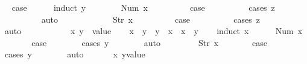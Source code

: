\begin{isabellebody}
\ \isamarkupfalse%
\ {\isacharquery}case\isanewline
\ \ \ \ \isamarkupfalse%
\ {\isacharparenleft}induct\ y{\isacharparenright}\isanewline
\ \ \ \ \ \ \isamarkupfalse%
\ {\isacharparenleft}Num\ x{\isacharparenright}\isanewline
\ \ \ \ \ \ \isamarkupfalse%
\ \isamarkupfalse%
\ {\isacharquery}case\isanewline
\ \ \ \ \ \ \ \ \isamarkupfalse%
\ {\isacharparenleft}cases\ z{\isacharparenright}\isanewline
\ \ \ \ \ \ \ \ \isamarkupfalse%
\ auto\isanewline
\ \ \ \ \isamarkupfalse%
\isanewline
\ \ \ \ \ \ \isamarkupfalse%
\ {\isacharparenleft}Str\ x{\isacharparenright}\isanewline
\ \ \ \ \ \ \isamarkupfalse%
\ \isamarkupfalse%
\ {\isacharquery}case\isanewline
\ \ \ \ \ \ \ \ \isamarkupfalse%
\ {\isacharparenleft}cases\ z{\isacharparenright}\isanewline
\ \ \ \ \ \ \ \ \isamarkupfalse%
\ auto\isanewline
\ \ \ \ \isamarkupfalse%
\isanewline
\ \ \isamarkupfalse%
\isanewline
{}\isamarkupfalse%
\isanewline
\ \ \isamarkupfalse%
\ x\ y\ {\isacharcolon}{\isacharcolon}\ {\isachardoublequoteopen}value{\isachardoublequoteclose}\isanewline
\ \ \isamarkupfalse%
\ {\isachardoublequoteopen}x\ {\isasymle}\ y\ {\isasymLongrightarrow}\ y\ {\isasymle}\ x\ {\isasymLongrightarrow}\ x\ {\isacharequal}\ y{\isachardoublequoteclose}\isanewline
\ \ \isamarkupfalse%
\ {\isacharparenleft}induct\ x{\isacharparenright}\isanewline
\ \ \ \ \isamarkupfalse%
\ {\isacharparenleft}Num\ x{\isacharparenright}\isanewline
\ \ \ \ \isamarkupfalse%
\ \isamarkupfalse%
\ {\isacharquery}case\isanewline
\ \ \ \ \ \ \isamarkupfalse%
\ {\isacharparenleft}cases\ y{\isacharparenright}\isanewline
\ \ \ \ \ \ \isamarkupfalse%
\ auto\isanewline
\ \ \isamarkupfalse%
\isanewline
\ \ \ \ \isamarkupfalse%
\ {\isacharparenleft}Str\ x{\isacharparenright}\isanewline
\ \ \ \ \isamarkupfalse%
\ \isamarkupfalse%
\ {\isacharquery}case\isanewline
\ \ \ \ \ \ \isamarkupfalse%
\ {\isacharparenleft}cases\ y{\isacharparenright}\isanewline
\ \ \ \ \ \ \isamarkupfalse%
\ auto\isanewline
\ \ \isamarkupfalse%
\isanewline
{}\isamarkupfalse%
\isanewline
\ \ \isamarkupfalse%
\ x\ y{\isacharcolon}{\isacharcolon}{\isachardoublequoteopen}value{\isachardoublequoteclose}\isanewline

\end{isabellebody}
